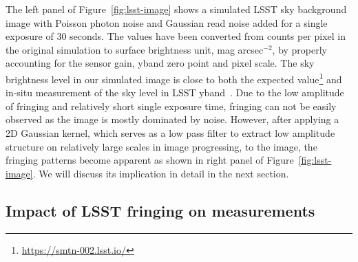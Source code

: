 \documentclass[twocolumn]{aastex63} %
\begin{document}
\begin{CJK*}{UTF8}{gbsn}
The left panel of Figure~\ref{fig:lsst-image} shows a simulated LSST sky background image with Poisson photon noise and Gaussian read noise added for a single exposure of $30$ seconds. The values have been converted from counts per pixel in the original simulation to surface brightness unit, mag arcsec$^{-2}$, by properly accounting for the sensor gain, yband zero point and pixel scale. The sky brightness level in our simulated image is close to both the expected value\footnote{\url{https://smtn-002.lsst.io/}} and in-situ measurement of the sky level in LSST yband~\citep{High10}. Due to the low amplitude of fringing and relatively short single exposure time, fringing can not be easily observed as the image is mostly dominated by noise. However, after applying a 2D Gaussian kernel, which serves as a low pass filter to extract low amplitude structure on relatively large scales in image progressing, to the image, the fringing patterns become apparent as shown in right panel of Figure~\ref{fig:lsst-image}. We will discuss its implication in detail in the next section.



\subsection{Impact of LSST fringing on measurements}




\end{CJK*}
\end{document}
